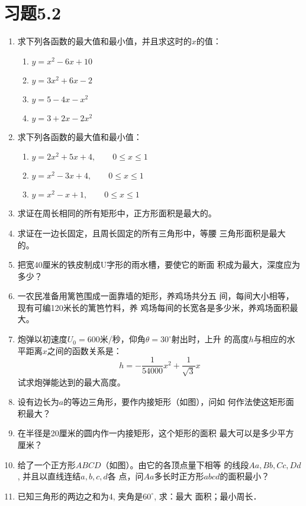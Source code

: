 \section*{习题5.2}
\begin{enumerate}
    \item 求下列各函数的最大值和最小值，并且求这时的$x$的值：
\begin{multicols}{2}
\begin{enumerate}
    \item $y=x^2-6x+10$
    \item $y=3x^2+6x-2$
    \item $y=5-4x-x^2$
    \item $y=3+2x-2x^2$
\end{enumerate}
\end{multicols}
    \item 求下列各函数的最大值和最小值：
\begin{enumerate}
    \item $y=2x^2+5x+4,\qquad    0\le x\le 1$
    \item $y=x^2-3x+4,\qquad      0\le x\le 1$
    \item $y=x^2-x+1,\qquad      0\le x\le 1$
\end{enumerate}
\item 求证在周长相同的所有矩形中，正方形面积是最大的。
\item 求证在一边长固定，且周长固定的所有三角形中，等腰
三角形面积是最大的。
\item 把宽40厘米的铁皮制成U字形的雨水槽，要使它的断面
积成为最大，深度应为多少？
\item 一农民准备用篱笆围成一面靠墙的矩形，养鸡场共分五
间，每间大小相等，现有可编120米长的篱笆竹料，养
鸡场每间的长宽各是多少米，养鸡场面积最大。
\item 炮弹以初速度$U_0=600$米/秒，仰角$\theta=30^{\circ}$射出时，上升
的高度$h$与相应的水平距离$x$之间的函数关系是：
\[h=-\frac{1}{54000}x^2+\frac{1}{\sqrt{3}}x\]
试求炮弹能达到的最大高度。
\item 设有边长为$a$的等边三角形，要作内接矩形（如图），问如
何作法使这矩形面积最大？
\item 在半径是20厘米的圆内作一内接矩形，这个矩形的面积
最大可以是多少平方厘米？
\item 给了一个正方形$ABCD$（如图）。由它的各顶点量下相等
的线段$Aa,Bb,Cc,Dd$, 并且以直线连结$a,b,c,d$各
点，问$Aa$多长时正方形$abcd$的面积最小？
\item 已知三角形的两边之和为4, 夹角是$60^{\circ}$, 求：最大
面积；最小周长．


\end{enumerate}
